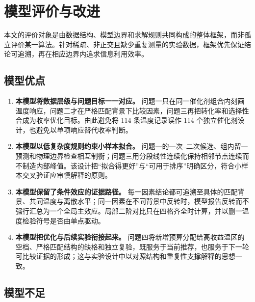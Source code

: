 \section{模型评价与改进}

本文的评价对象是由数据结构、模型边界和求解规则共同构成的整体框架，而非孤立评价某一算法。针对稀疏、非正交且缺少重复测量的实验数据，框架优先保证结论可追溯，再在相应边界内追求信息利用效率。

\subsection{模型优点}

\begin{enumerate}
  \item \textbf{本模型将数据层级与问题目标一一对应。} 问题一只在同一催化剂组合内刻画温度响应，问题二才在严格匹配背景下比较因素，问题三再把转化率和选择性合成为收率优化目标。由此避免将 114 条温度记录误作 114 个独立催化剂设计，也避免以单项响应替代收率判断。
  \item \textbf{本模型以低复杂度规则约束小样本拟合。} 问题一的一次--二次候选、组内留一预测和物理边界检查相互制衡；问题三用分段线性连续化保持相邻节点连续而不制造内部峰值。该设计把“拟合得更好”与“可用于排序”明确区分，符合小样本交叉验证应审慎解释的原则\cite{stone1974,arlot2010,hastie2009}。
  \item \textbf{本模型保留了条件效应的证据路径。} 每一因素结论都可追溯至具体的匹配背景、共同温度与离散水平；同一因素在不同背景中反转时，模型报告反转而不强行汇总为一个全局主效应。局部二阶对比只在四格齐全时计算，并以删一温度检验符号是否由单点驱动。
  \item \textbf{本模型把优化与后续实验衔接起来。} 问题四将新增预算分配给高收益温区的空档、严格匹配结构的缺格和独立复验，既服务于当前推荐，也服务于下一轮可比较证据的形成；这与实验设计中以对照结构和重复性支撑解释的思想一致\cite{montgomery2017,box2005}。
\end{enumerate}

\subsection{模型不足}


